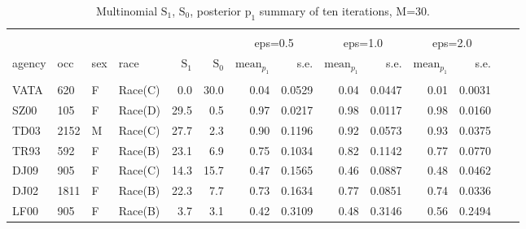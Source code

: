 \documentclass[10pt, letterpaper]{article}
\begin{document}
\begin{spacing}{1.0}
\begin{table}[h!]
    \centering
    \caption{Multinomial $\text{S}_1$, $\text{S}_0$, posterior $\text{p}_1$ summary of ten iterations, M=30.}
    \label{table:mn1-M30}
    \begin{tabular}{llllrrrrrrrrrr}
        \hline\\[-10pt]
        & & & & & & \multicolumn{2}{c}{eps=0.5} & \multicolumn{2}{c}{eps=1.0} & \multicolumn{2}{c}{eps=2.0} \\
        agency & occ & sex & race & $\text{S}_1$ & $\text{S}_0$ & $\text{mean}_{p_1}$ & s.e. & $\text{mean}_{p_1}$ & s.e. & $\text{mean}_{p_1}$ & s.e. \\ 
        \hline\\[-6pt]
        VATA & 620 & F & Race(C) & 0.0 & 30.0 & 0.04 & 0.0529 & 0.04 & 0.0447 & 0.01 & 0.0031 \\ 
        SZ00 & 105 & F & Race(D) & 29.5 & 0.5 & 0.97 & 0.0217 & 0.98 & 0.0117 & 0.98 & 0.0160 \\ 
        TD03 & 2152 & M & Race(C) & 27.7 & 2.3 & 0.90 & 0.1196 & 0.92 & 0.0573 & 0.93 & 0.0375 \\ 
        TR93 & 592 & F & Race(B) & 23.1 & 6.9 & 0.75 & 0.1034 & 0.82 & 0.1142 & 0.77 & 0.0770 \\ 
        DJ09 & 905 & F & Race(C) & 14.3 & 15.7 & 0.47 & 0.1565 & 0.46 & 0.0887 & 0.48 & 0.0462 \\ 
        DJ02 & 1811 & F & Race(B) & 22.3 & 7.7 & 0.73 & 0.1634 & 0.77 & 0.0851 & 0.74 & 0.0336 \\ 
        LF00 & 905 & F & Race(B) & 3.7 & 3.1 & 0.42 & 0.3109 & 0.48 & 0.3146 & 0.56 & 0.2494 \\ 
        \hline
    \end{tabular}
\end{table}


\end{spacing}
\end{document}
